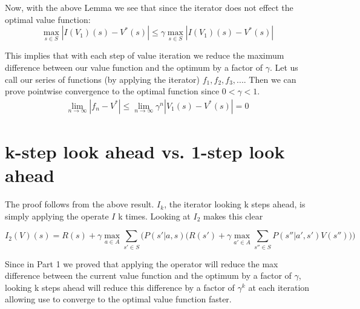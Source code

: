 \documentclass{article}
\begin{document}
Now, with the above Lemma we see that since the iterator does not effect the optimal value function:
\begin{equation*}
\max_{s \in S} | I(V_1)(s) - V^{*}(s) | \leq \gamma \max_{s \in S} | I(V_1)(s) - V^{*}(s) |
\end{equation*}

This implies that with each step of value iteration we reduce the maximum difference between our value function and the optimum by a factor of $\gamma$.  Let us call our series of functions (by applying the iterator) $f_1, f_2, f_3, ...$. Then we can prove pointwise convergence to the optimal function since $0 < \gamma < 1$.
\begin{align*}
\lim_{n\to\infty} |f_n - V^{*}| \leq \lim_{n\to\infty} \gamma^{n} |V_1(s) - V^{*}(s) | = 0
\end{align*}

\section{k-step look ahead vs. 1-step look ahead}
The proof follows from the above result. $I_k$, the iterator looking k steps ahead, is simply applying the operate $I$ k times. Looking at $I_2$ makes this clear

\begin{equation*}
I_{2}(V)(s) = R(s) + \gamma \max_{a \in A} \sum_{s' \in S} \big( P(s' | a, s) \big(R(s') + \gamma \max_{a' \in A} \sum_{s'' \in S} P(s'' | a', s') V(s'')\big) \big)
\end{equation*}

Since in Part 1 we proved that applying the operator will reduce the max difference between the current value function and the optimum by a factor of $\gamma$, looking k steps ahead will reduce this difference by a factor of $\gamma^k$ at each iteration allowing use to converge to the optimal value function faster.
\end{document}
